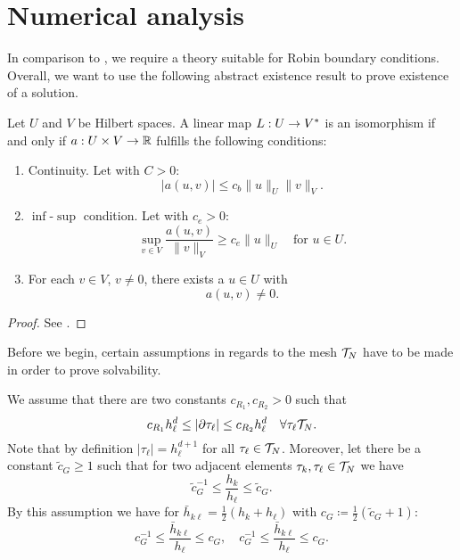 \documentclass[../thesis.tex]{subfiles}
\begin{document}
\section{Numerical analysis}
In comparison to \cite{Neumueller}, we require a theory suitable for Robin boundary conditions.
Overall, we want to use the following abstract existence result to prove existence of a solution.
\begin{theorem}
\label{thm:Necas-Babuska}
Let $U$ and $V$ be Hilbert spaces. A linear map $L : U \to V^*$ is an isomorphism if and only if $a : U \times V \to \mathbb{R}$ fulfills the following conditions:
\begin{enumerate}
\item Continuity. Let with $C > 0$:
\[
	| a(u, v) | \leq c_b \| u \|_U \| v \|_V.
\]
\item $\inf$-$\sup$ condition. Let with $c_e > 0$:
\[
	\sup_{v \in V} \frac{a(u, v)}{\| v \|_V} \geq c_e \| u \|_U \quad \text{for } u \in U.
\] 
\item For each $v \in V$, $v \neq 0$, there exists a $u \in U$ with
\[
	a(u, v) \neq 0.
\]
\end{enumerate}
\begin{proof}
See \cite[3.6 Satz]{Braess}.
\end{proof}
\end{theorem}
Before we begin, certain assumptions in regards to the mesh $\mathcal{T}_N$ have to be made in order to prove solvability.
\begin{assumption}
\label{as:mesh-assumptions}
We assume that there are two constants $c_{R_1}, c_{R_2} > 0$ such that
\[
	c_{R_1} h_\ell^d \leq |\partial \tau_\ell| \leq c_{R_2} h_\ell^d \quad \forall \tau_\ell \mathcal{T}_N.
\]
Note that by definition $|\tau_\ell| = h_\ell^{d+1}$ for all $\tau_\ell \in \mathcal{T}_N$.
Moreover, let there be a constant $\tilde{c}_G \geq 1$ such that for two adjacent elements $\tau_k, \tau_\ell \in \mathcal{T}_N$ we have
\[
	\tilde{c}_G^{-1} \leq \frac{h_k}{h_\ell} \leq \tilde{c}_G.
\]
By this assumption we have for $\bar{h}_{k\ell} = \frac{1}{2} (h_k + h_\ell)$ with $c_G \coloneqq \frac{1}{2} (\tilde{c}_G + 1)$:
\[
	c_G^{-1} \leq \frac{\bar{h}_{k\ell}}{h_\ell} \leq c_G, \quad c_G^{-1} \leq \frac{\bar{h}_{k\ell}}{h_\ell} \leq c_G.
\]
\end{assumption}
\end{document}
